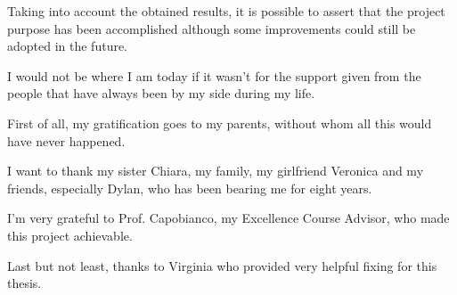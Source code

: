 \documentclass[Lau,oneside,noexaminfo]{sapthesis} %
\begin{document}
Taking into account the obtained results, it is possible to assert that the project purpose has been accomplished although some improvements could still be adopted in the future. 


\backmatter

\cleardoublepage
{} %
{}


\begin{acknowledgments}
I would not be where I am today if it wasn't for the support given from the people that have always been by my side during my life.

First of all, my gratification goes to my parents, without whom all this would have never happened.

I want to thank my sister Chiara, my family, my girlfriend Veronica and my friends, especially Dylan, who has been bearing me for eight years.

I'm very grateful to Prof. Capobianco, my Excellence Course Advisor, who made this project achievable.

Last but not least, thanks to Virginia who provided very helpful fixing for this thesis.
\end{acknowledgments}
\end{document}
